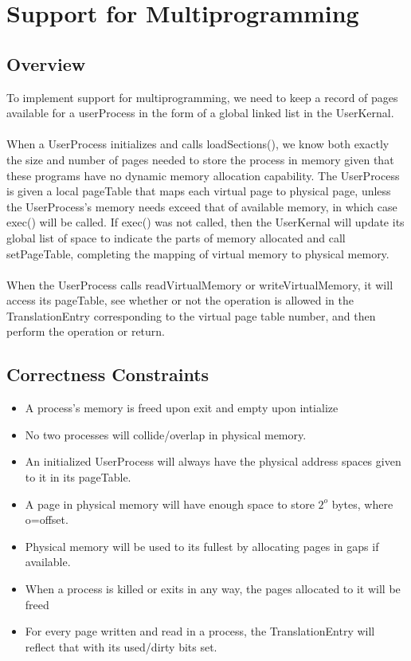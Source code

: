 \section{Support for Multiprogramming}

\subsection{Overview}
To implement support for multiprogramming, we need to keep a record of pages available for a userProcess in the form of a global linked list in the UserKernal. \\\\
When a UserProcess initializes and calls loadSections(), we know both exactly the size and number of pages needed to store the process in memory given that these programs have no dynamic memory allocation capability. The UserProcess is given a local pageTable that maps each virtual page to physical page, unless the UserProcess's memory needs exceed that of available memory, in which case exec() will be called. If exec() was not called, then the UserKernal will update its global list of space to indicate the parts of memory allocated and call setPageTable, completing the mapping of virtual memory to physical memory.\\\\
When the UserProcess calls readVirtualMemory or writeVirtualMemory, it will access its pageTable, see whether or not the operation is allowed in the TranslationEntry corresponding to the virtual page table  number, and then perform the operation or return.

\subsection{Correctness Constraints}
\begin{itemize}
\item A process's memory is freed upon exit and empty upon intialize
\item No two processes will collide/overlap in physical memory.
\item An initialized UserProcess will always have the physical address spaces given to it in its pageTable.
\item A page in physical memory will have enough space to store $2^{o}$ bytes, where o=offset.
\item Physical memory will be used to its fullest by allocating pages in gaps if available.
\item When a process is killed or exits in any way, the pages allocated to it will be freed
\item For every page written and read in a process, the TranslationEntry will reflect that with its used/dirty bits set.
\end{itemize}

